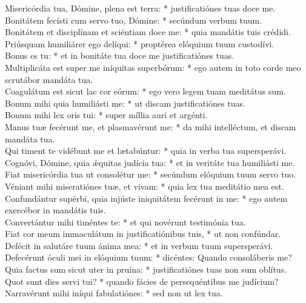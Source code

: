 {	Misericórdia tua, Dómine, plena est terra: * justificatiónes tuas doce me. \\
	Bonitátem fecísti cum servo tuo, Dómine: * secúndum verbum tuum. \\
	Bonitátem et disciplínam et sciéntiam doce me: * quia mandátis tuis crédidi. \\
	Priúsquam humiliárer ego delíqui: * proptérea elóquium tuum custodívi. \\
	Bonus es tu: * et in bonitáte tua doce me justificatiónes tuas. \\
	Multiplicáta est super me iníquitas superbórum: * ego autem in toto corde meo scrutábor mandáta tua. \\
	Coagulátum est sicut lac cor eórum: * ego vero legem tuam meditátus sum. \\
	Bonum mihi quia humiliásti me: * ut discam justificatiónes tuas. \\
	Bonum mihi lex oris tui: * super míllia auri et argénti. \\
	Manus tuæ fecérunt me, et plasmavérunt me: * da mihi intelléctum, et discam mandáta tua. \\
	Qui timent te vidébunt me et lætabúntur: * quia in verba tua supersperávi. \\
	Cognóvi, Dómine, quia ǽquitas judícia tua: * et in veritáte tua humiliásti me. \\
	Fiat misericórdia tua ut consolétur me: * secúndum elóquium tuum servo tuo. \\
	Véniant mihi miseratiónes tuæ, et vivam: * quia lex tua meditátio mea est. \\
	Confundántur supérbi, quia injúste iniquitátem fecérunt in me: * ego autem exercébor in mandátis tuis. \\
	Convertántur mihi timéntes te: * et qui novérunt testimónia tua. \\
	Fiat cor meum immaculátum in justificatiónibus tuis, * ut non confúndar. \\
	Defécit in salutáre tuum ánima mea: * et in verbum tuum supersperávi. \\
	Defecérunt óculi mei in elóquium tuum: * dicéntes: Quando consoláberis me? \\
	Quia factus sum sicut uter in pruína: * justificatiónes tuas non sum oblítus. \\
	Quot sunt dies servi tui? * quando fácies de persequéntibus me judícium? \\
	Narravérunt mihi iníqui fabulatiónes: * sed non ut lex tua. \\
}
